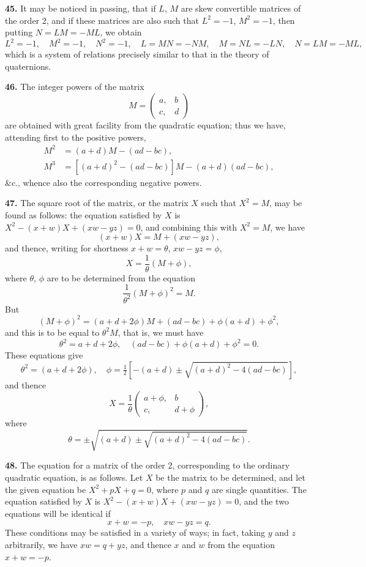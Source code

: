 \documentclass[11pt,a4paper]{book}
\begin{document}
\begin{center}
\medskip
\noindent\textbf{45.} It may be noticed in passing, that if $L$, $M$ are skew convertible matrices of the order 2, and if these matrices are also such that $L^2=-1$, $M^2=-1$, then putting $N=LM=-ML$, we obtain
\[
L^2=-1,\quad M^2=-1,\quad N^2=-1,\quad L=MN=-NM,\quad M=NL=-LN,\quad N=LM=-ML,
\]
which is a system of relations precisely similar to that in the theory of quaternions.

\medskip
\noindent\textbf{46.} The integer powers of the matrix
\[
M = \begin{pmatrix} a, & b \\ c, & d \end{pmatrix}
\]
are obtained with great facility from the quadratic equation; thus we have, attending first to the positive powers,
\begin{align*}
M^2 &= (a+d)M - (ad-bc), \\
M^3 &= [(a+d)^2-(ad-bc)]M - (a+d)(ad-bc),
\end{align*}
\&c., whence also the corresponding negative powers.

\medskip
\noindent\textbf{47.} The square root of the matrix, or the matrix $X$ such that $X^2=M$, may be found as follows: the equation satisfied by $X$ is $X^2-(x+w)X+(xw-yz)=0$, and combining this with $X^2=M$, we have
\[(x+w)X = M + (xw-yz),\]
and thence, writing for shortness $x+w=\theta$, $xw-yz=\phi$,
\[X = \frac{1}{\theta}(M+\phi),\]
where $\theta$, $\phi$ are to be determined from the equation
\[\frac{1}{\theta^2}(M+\phi)^2 = M.\]
But
\[(M+\phi)^2 = (a+d+2\phi)M + (ad-bc) + \phi(a+d) + \phi^2,\]
and this is to be equal to $\theta^2 M$, that is, we must have
\[
\theta^2 = a+d+2\phi,\quad (ad-bc)+\phi(a+d)+\phi^2=0.
\]
These equations give
\[
\theta^2 = (a+d+2\phi),\quad \phi = \tfrac{1}{2}[-(a+d) \pm \sqrt{(a+d)^2 - 4(ad-bc)}],
\]
and thence
\[
X = \frac{1}{\theta}\begin{pmatrix} a+\phi, & b \\ c, & d+\phi \end{pmatrix},
\]
where
\[
\theta = \pm\sqrt{(a+d) \pm \sqrt{(a+d)^2 - 4(ad-bc)}}.
\]

\medskip
\noindent\textbf{48.} The equation for a matrix of the order 2, corresponding to the ordinary quadratic equation, is as follows. Let $X$ be the matrix to be determined, and let the given equation be $X^2 + pX + q = 0$, where $p$ and $q$ are single quantities. The equation satisfied by $X$ is $X^2 - (x+w)X + (xw-yz) = 0$, and the two equations will be identical if
\[x+w = -p,\quad xw-yz = q.\]
These conditions may be satisfied in a variety of ways; in fact, taking $y$ and $z$ arbitrarily, we have $xw = q+yz$, and thence $x$ and $w$ from the equation $x+w=-p$.


\end{center}
\end{document}
